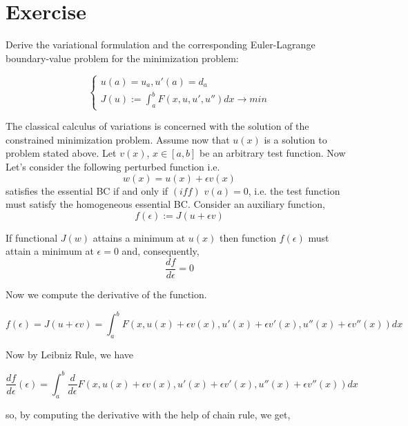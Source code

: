 
\section{Exercise}

Derive the variational formulation and the corresponding Euler-Lagrange boundary-value
problem for the minimization problem:

\[ \begin{cases} 
      u(a)=u_a,  u'(a)=d_a \\
      J(u):= \int_{a}^{b} F(x,u,u',u'')dx \longrightarrow min
   \end{cases}  
\]

\noindent
The classical calculus of variations is concerned with the solution of the constrained minimization problem. Assume now that $u(x)$ is a solution to problem stated above. Let $v(x)$, $x \in [a, b]$ be an arbitrary test function.\newline
Now Let's consider the following perturbed function i.e.
\begin{equation}
    w(x) = u(x) + \epsilon v(x)
\end{equation}
\noindent satisfies the essential BC if and only if $(iff)$ $v(a) = 0$, i.e. the test function must satisfy the homogeneous essential BC. Consider an auxiliary function,
\begin{equation}
    f(\epsilon) := J(u + \epsilon v)  
\end{equation}

\noindent
If functional $J(w)$ attains a minimum at $u(x)$ then function $f(\epsilon)$ must attain a minimum at  $\epsilon= 0$ and, consequently,
\begin{equation}
    \frac{df}{d\epsilon}=0
\end{equation}

\noindent Now we compute the derivative of the function.

\begin{equation}
    f(\epsilon) = J(u+\epsilon v) = \int_{a}^{b} F(x,u(x)+\epsilon v(x),u'(x)+\epsilon v'(x),u''(x)+\epsilon v''(x))dx
\end{equation}

\noindent Now by Leibniz Rule, we have

\begin{equation}
    \frac{df}{d\epsilon}(\epsilon) = \int_{a}^{b} \frac{d}{d\epsilon}  F(x,u(x)+\epsilon v(x),u'(x)+\epsilon v'(x),u''(x)+\epsilon v''(x))dx
\end{equation}

\noindent so, by computing the derivative with the help of chain rule, we get,

